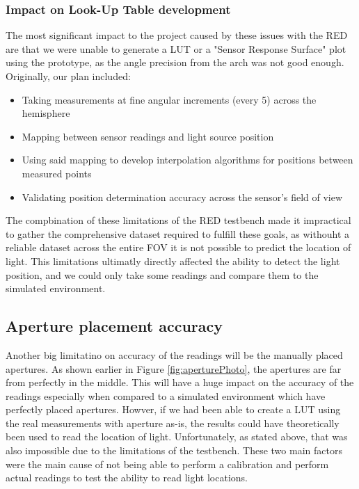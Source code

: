 \subsubsection{Impact on Look-Up Table development}

The most significant impact to the project caused by these issues with the \ac{RED} are that we were unable to generate a \ac{LUT} or a "Sensor Response Surface" plot using the prototype, as the angle precision from the arch was not good enough. Originally, our plan included:

\begin{itemize}
    \item Taking measurements at fine angular increments (every 5\textdegree{}) across the hemisphere
    \item Mapping between sensor readings and light source position
    \item Using said mapping to develop interpolation algorithms for positions between measured points
    \item Validating position determination accuracy across the sensor's field of view
\end{itemize}

The compbination of these limitations of the \ac{RED} testbench made it impractical to gather the comprehensive dataset required to fulfill these goals, as withouht a reliable dataset across the entire \ac{FOV} it is not possible to predict the location of light.
This limitations ultimatly directly affected the ability to detect the light position, and we could only take some readings and compare them to the simulated environment.

\subsection{Aperture placement accuracy}

Another big limitatino on accuracy of the readings will be the manually placed apertures. As shown earlier in Figure \ref{fig:aperturePhoto}, the apertures are far from perfectly in the middle. This will have a huge impact on the accuracy of the readings especially when compared to a simulated environment which have perfectly placed apertures. Howver, if we had been able to create a \ac{LUT} using the real measurements with aperture as-is, the results could have theoretically been used to read the location of light. Unfortunately, as stated above, that was also impossible due to the limitations of the testbench. These two main factors were the main cause of not being able to perform a calibration and perform actual readings to test the ability to read light locations. 

